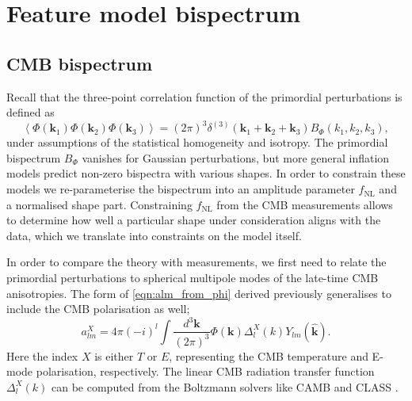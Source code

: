 \section{Feature model bispectrum} \label{section: feature model bispectrum}
\subsection{CMB bispectrum}

Recall that the three-point correlation function of the primordial perturbations is defined as
\begin{equation}
	\left< \Phi(\mathbf{k}_1) \Phi(\mathbf{k}_2) \Phi(\mathbf{k}_3) \right> = (2\pi)^3 \delta^{(3)}(\mathbf{k}_1 + \mathbf{k}_2 + \mathbf{k}_3) B_\Phi (k_1, k_2, k_3),
\end{equation}
under assumptions of the statistical homogeneity and isotropy. The primordial bispectrum $B_\Phi$ vanishes for Gaussian perturbations, but more general inflation models predict non-zero bispectra with various shapes.  In order to constrain these models we re-parameterise the bispectrum into an amplitude parameter $f_\text{NL}$ and a normalised shape part. Constraining $f_\text{NL}$ from the CMB measurements allows to determine how well a particular shape under consideration aligns with the data, which we translate into constraints on the model itself.

In order to compare the theory with measurements, we first need to relate the primordial perturbations to spherical multipole modes of the late-time CMB anisotropies. The form of \eqref{eqn:alm_from_phi} derived previously generalises to include the CMB polarisation as well;
\begin{equation}
	a_{lm}^{X} = 4\pi(-i)^l \int \frac{d^3\mathbf{k}}{(2\pi)^3}  \Phi(\mathbf{k}) \Delta_l^X(k) Y_{lm}(\hat{\mathbf{k}}).
	\label{theoretical multiple moments}
\end{equation}
Here the index $X$ is either $T$ or $E$, representing the CMB temperature and E-mode polarisation, respectively. The linear CMB radiation transfer function $\Delta_l^X(k)$ can be computed from the Boltzmann solvers like CAMB \cite{Lewis2000} and CLASS \cite{Blas2011class}.

